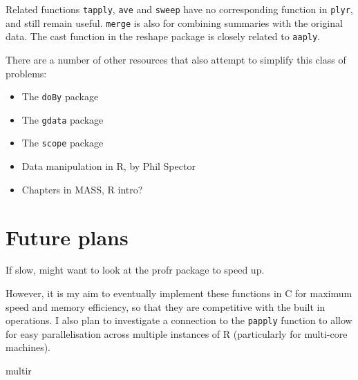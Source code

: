 \documentclass[letterpage]{scrartcl}
\begin{document}
Related functions {\tt tapply}, {\tt ave} and {\tt sweep} have no corresponding function in {\tt plyr}, and still remain useful. {\tt merge} is also for combining summaries with the original data.  The cast function in the reshape package \citep{reshape} is closely related to {\tt aaply}.

There are a number of other resources that also attempt to simplify this class of problems:

\begin{itemize}
  \item The {\tt doBy} package
  \item The {\tt gdata} package
  \item The {\tt scope} package
  \item Data manipulation in R, by Phil Spector
  \item Chapters in MASS, R intro?
  
\end{itemize}

\section{Future plans}
\label{sec:future}

If slow, might want to look at the profr package to speed up.  

However, it is my aim to eventually implement these functions in C for maximum speed and memory efficiency, so that they are competitive with the built in operations.  I also plan to investigate a connection to the {\tt papply} function to allow for easy parallelisation across multiple instances of R (particularly for multi-core machines).

multir


\end{document}

